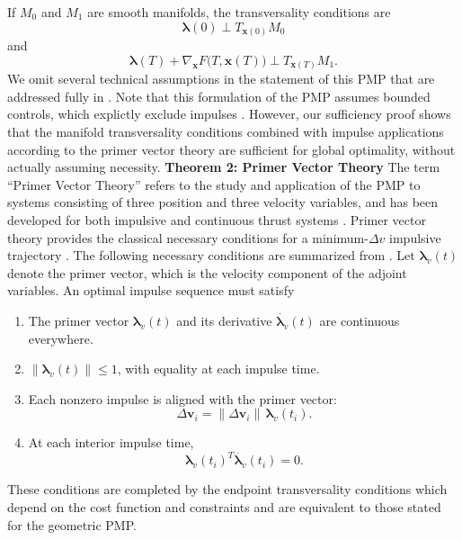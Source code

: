 \documentclass[letterpaper, 10 pt, conference]{ieeeconf}  %
\begin{document}
If $M_0$ and $M_1$ are smooth manifolds, the transversality
conditions are
\[
    \boldsymbol{\lambda}(0)
    \perp T_{\mathbf{x}(0)}M_0
\]
and
\[
    \boldsymbol{\lambda}(T)
    +
    \nabla_{\mathbf{x}}F
    \bigl(T,\mathbf{x}(T)\bigr)
    \perp T_{\mathbf{x}(T)}M_1.
\]
\newline
We omit several technical assumptions in the statement of this PMP that are addressed fully in \cite{Bonnans2008}. Note that this formulation of the PMP assumes bounded controls, which explictly exclude impulses \cite{Bonnans2008}. However, our sufficiency proof shows that the manifold transversality conditions combined with impulse applications according to the primer vector theory are sufficient for global optimality, without actually assuming necessity. \newline
\textbf{Theorem 2: Primer Vector Theory} \newline
The term ``Primer Vector Theory'' refers to the study and application of the PMP to systems consisting of three position and three velocity variables, and has been developed for both impulsive and continuous thrust systems \cite{Prussing2010, Russell2007}. 
Primer vector theory provides the classical necessary conditions for a minimum-$\Delta v$ impulsive trajectory \cite{Prussing2010}. The following necessary conditions are summarized from \cite{Prussing2010}. Let $\boldsymbol{\lambda}_v(t)$ denote the primer vector, which is the velocity component of the adjoint variables. An optimal impulse sequence must satisfy
\begin{enumerate}
    \item The primer vector $\boldsymbol{\lambda}_v(t)$ and its derivative $\dot{\boldsymbol{\lambda}_v}(t)$ are continuous everywhere.
    \item $\lVert\boldsymbol{\lambda}_v(t)\rVert\leq 1$, with equality at each impulse time.
    \item Each nonzero impulse is aligned with the primer vector:
    \[
    \Delta\mathbf{v}_i
    =\lVert\Delta\mathbf{v}_i\rVert\,\boldsymbol{\lambda}_v(t_i).
    \]
    \item At each interior impulse time,
    \[
    \boldsymbol{\lambda}_v(t_i)^T\dot{\boldsymbol{\lambda}_v}(t_i)=0.
    \]
\end{enumerate}

These conditions are completed by the endpoint transversality conditions which depend on the cost function and constraints and are equivalent to those stated for the geometric PMP. 
\end{document}
